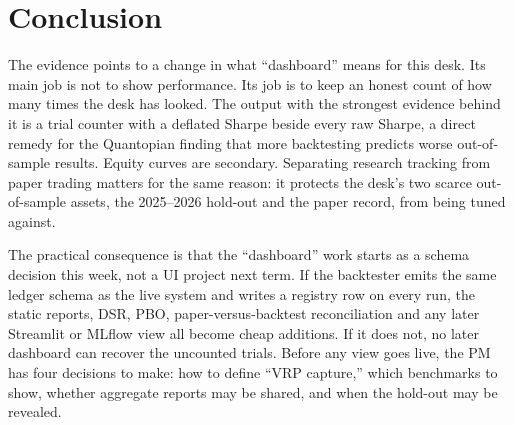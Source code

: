 \documentclass{article}
\begin{document}
\section{Conclusion}

The evidence points to a change in what ``dashboard'' means for this desk. Its main job is not to show performance. Its job is to keep an honest count of how many times the desk has looked. The output with the strongest evidence behind it is a trial counter with a deflated Sharpe beside every raw Sharpe, a direct remedy for the Quantopian finding that more backtesting predicts worse out-of-sample results. Equity curves are secondary. Separating research tracking from paper trading matters for the same reason: it protects the desk's two scarce out-of-sample assets, the 2025--2026 hold-out and the paper record, from being tuned against.

The practical consequence is that the ``dashboard'' work starts as a schema decision this week, not a UI project next term. If the backtester emits the same ledger schema as the live system and writes a registry row on every run, the static reports, DSR, PBO, paper-versus-backtest reconciliation and any later Streamlit or MLflow view all become cheap additions. If it does not, no later dashboard can recover the uncounted trials. Before any view goes live, the PM has four decisions to make: how to define ``VRP capture,'' which benchmarks to show, whether aggregate reports may be shared, and when the hold-out may be revealed.
\end{document}
